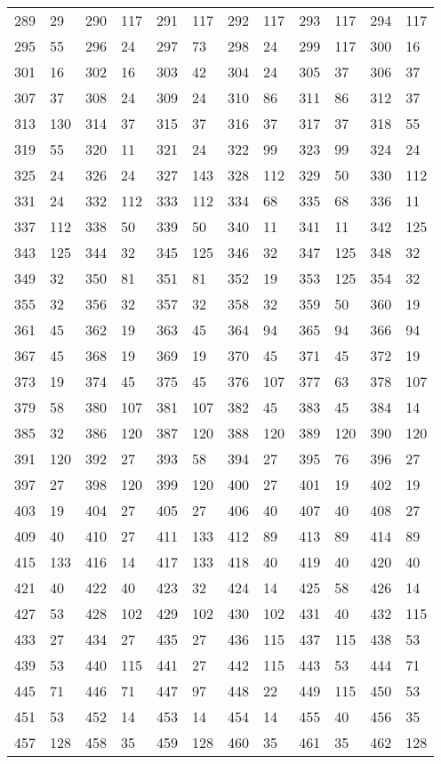 \begin{longtable}{llllllllllll}
289 & 29&290 &117&291& 117&292 &117&293 &117&294& 117\\
295 & 55&296 &24&297& 73&298 &24&299 &117&300& 16\\
301 & 16&302 &16&303& 42&304 &24&305 &37&306& 37\\
307 & 37&308 &24&309& 24&310 &86&311 &86&312& 37\\
313 & 130&314 &37&315& 37&316 &37&317 &37&318& 55\\
319 & 55&320 &11&321& 24&322 &99&323 &99&324& 24\\
325 & 24&326 &24&327& 143&328 &112&329 &50&330& 112\\
331 & 24&332 &112&333& 112&334 &68&335 &68&336& 11\\
337 & 112&338 &50&339& 50&340 &11&341 &11&342& 125\\
343 & 125&344 &32&345& 125&346 &32&347 &125&348& 32\\
349 & 32&350 &81&351& 81&352 &19&353 &125&354& 32\\
355 & 32&356 &32&357& 32&358 &32&359 &50&360& 19\\
361 & 45&362 &19&363& 45&364 &94&365 &94&366& 94\\
367 & 45&368 &19&369& 19&370 &45&371 &45&372& 19\\
373 & 19&374 &45&375& 45&376 &107&377 &63&378& 107\\
379 & 58&380 &107&381& 107&382 &45&383 &45&384& 14\\
385 & 32&386 &120&387& 120&388 &120&389 &120&390& 120\\
391 & 120&392 &27&393& 58&394 &27&395 &76&396& 27\\
397 & 27&398 &120&399& 120&400 &27&401 &19&402& 19\\
403 & 19&404 &27&405& 27&406 &40&407 &40&408& 27\\
409 & 40&410 &27&411& 133&412 &89&413 &89&414& 89\\
415 & 133&416 &14&417& 133&418 &40&419 &40&420& 40\\
421 & 40&422 &40&423& 32&424 &14&425 &58&426& 14\\
427 & 53&428 &102&429& 102&430 &102&431 &40&432& 115\\
433 & 27&434 &27&435& 27&436 &115&437 &115&438& 53\\
439 & 53&440 &115&441& 27&442 &115&443 &53&444& 71\\
445 & 71&446 &71&447& 97&448 &22&449 &115&450& 53\\
451 & 53&452 &14&453& 14&454 &14&455 &40&456& 35\\
457 & 128&458 &35&459& 128&460 &35&461 &35&462& 128\\

\end{longtable}
